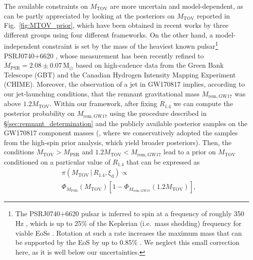 \documentclass[]{aa}
\newcommand{\resp}[1]{#1}
\begin{document}
The available constraints on $M_\mathrm{TOV}$ are more uncertain and model-dependent, as can be partly appreciated by looking at the posteriors on $M_\mathrm{TOV}$ reported in Fig.~\ref{fig:MTOV_prior}, which have been obtained in recent works by three different groups using four different frameworks. On the other hand, a model-independent constraint is set by the mass of the heaviest known pulsar\footnote{\resp{The PSRJ0740+6620 pulsar is inferred to spin at a frequency of roughly 350 Hz \citep{Cromartie2020}, which is up to 25\% of the Keplerian (i.e.\ mass shedding) frequency for viable EoSs \citep[see][]{Haensel2009}. Rotation at such a rate increases the maximum mass that can be supported by the EoS by up to 0.85\% \citep{Breu2016}. We neglect this small correction here, as it is well below our uncertainties.}} PSRJ0740+6620 \citep{Cromartie2020}, whose measurement has been recently refined \citep{Fonseca2021} to $M_\mathrm{PSR}=2.08\pm 0.07\,\mathrm{M_\odot}$ based on high-cadence data from the Green Bank Telescope (GBT) and the Canadian Hydrogen Intensity Mapping Experiment (CHIME). Moreover, \resp{the observation of a jet in GW170817 implies, according to our jet-launching conditions, that the remnant gravitational mass $M_\mathrm{rem,GW17}$ was above $1.2 M_\mathrm{TOV}$. Within our framework, after fixing $R_{1.4}$ we can compute the posterior probability on $M_\mathrm{rem,GW17}$ using the procedure described in \S\ref{sec:remnant_determination} and the publicly available posterior samples on the GW170817 component masses (\citealt{Abbott2019_GW170817_properties}, where we conservatively adopted the samples from the high-spin prior analysis, which yield broader posteriors). Then, the conditions $M_\mathrm{TOV}>M_\mathrm{PSR}$ and $1.2 M_\mathrm{TOV}<M_\mathrm{rem,GW17}$ lead to a prior on $M_\mathrm{TOV}$ conditioned on a particular value of $R_{1.4}$ that can be expressed as} 
 \begin{equation}
 \begin{split}
  & \pi(M_\mathrm{TOV}\,|\,R_{1.4},\xi_\mathrm{d}) \propto\\
  & \Phi_{M_\mathrm{PSR}}(M_\mathrm{TOV})\left[1-\Phi_{M_\mathrm{rem,GW17}}(1.2 M_\mathrm{TOV})\right],
 \end{split}
 \end{equation}
\end{document}

